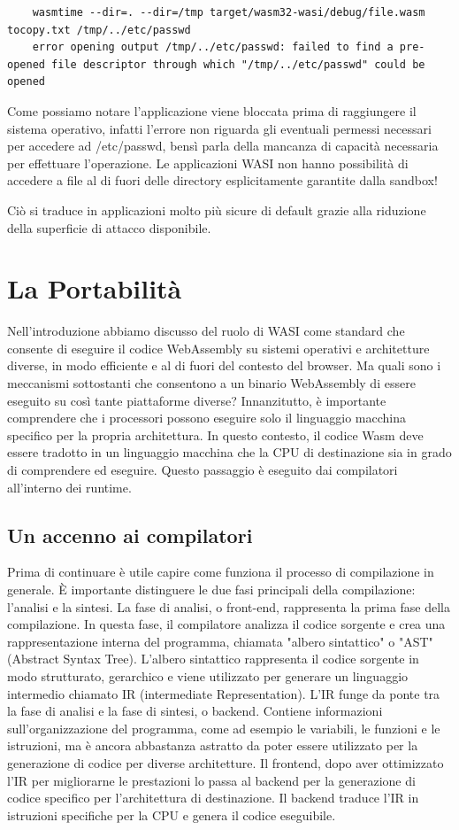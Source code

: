 \begin{lstlisting}
    wasmtime --dir=. --dir=/tmp target/wasm32-wasi/debug/file.wasm tocopy.txt /tmp/../etc/passwd
    error opening output /tmp/../etc/passwd: failed to find a pre-opened file descriptor through which "/tmp/../etc/passwd" could be opened
\end{lstlisting}

Come possiamo notare l'applicazione viene bloccata prima di raggiungere il sistema operativo, infatti l'errore non
riguarda gli eventuali permessi necessari per accedere ad /etc/passwd, bensì parla della mancanza di capacità necessaria
per effettuare l'operazione. Le applicazioni WASI non hanno possibilità di accedere a file al di fuori delle directory
esplicitamente garantite dalla sandbox!

Ciò si traduce in applicazioni molto più sicure di default grazie alla
riduzione della superficie di attacco disponibile.

\section{La Portabilità}
Nell'introduzione abbiamo discusso del ruolo di WASI come standard che consente di eseguire il codice WebAssembly su
sistemi operativi e architetture diverse, in modo efficiente e al di fuori del contesto del browser. Ma quali sono i
meccanismi sottostanti che consentono a un binario WebAssembly di essere eseguito su così tante piattaforme diverse?
Innanzitutto, è importante comprendere che i processori possono eseguire solo il linguaggio macchina specifico per la
propria architettura. In questo contesto, il codice Wasm deve essere tradotto in un linguaggio macchina che la CPU di
destinazione sia in grado di comprendere ed eseguire. Questo passaggio è eseguito dai compilatori all'interno dei
runtime.

\subsection{Un accenno ai compilatori}
Prima di continuare è utile capire come funziona il processo di compilazione in generale. È importante distinguere le
due fasi principali della compilazione: l'analisi e la sintesi. La fase di analisi, o front-end, rappresenta la prima
fase della compilazione. In questa fase, il compilatore analizza il codice sorgente e crea una rappresentazione interna
del programma, chiamata "albero sintattico" o "AST" (Abstract Syntax Tree). L'albero sintattico rappresenta il codice
sorgente in modo strutturato, gerarchico e viene utilizzato per generare un linguaggio intermedio chiamato IR
(intermediate Representation). L'IR funge da ponte tra la fase di analisi e la fase di sintesi, o backend. Contiene
informazioni sull'organizzazione del programma, come ad esempio le variabili, le funzioni e le istruzioni, ma è ancora
abbastanza astratto da poter essere utilizzato per la generazione di codice per diverse architetture. Il frontend, dopo
aver ottimizzato l'IR per migliorarne le prestazioni lo passa al backend per la generazione di codice specifico per
l'architettura di destinazione. Il backend traduce l'IR in istruzioni specifiche per la CPU e genera il codice
eseguibile.

